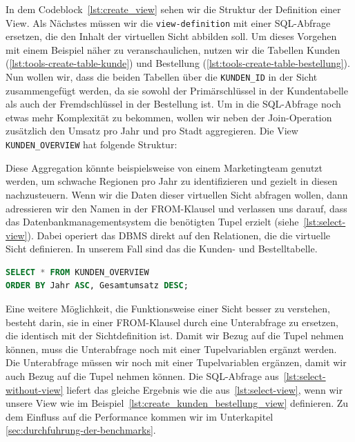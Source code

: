 In dem Codeblock~\ref{lst:create_view} sehen wir die Struktur der Definition einer View.
Als Nächstes müssen wir die \texttt{view-definition} mit einer SQL-Abfrage ersetzen, die den Inhalt der virtuellen Sicht abbilden soll.
Um dieses Vorgehen mit einem Beispiel näher zu veranschaulichen, nutzen wir die Tabellen Kunden (\ref{lst:tools-create-table-kunde}) und Bestellung (\ref{lst:tools-create-table-bestellung}).
Nun wollen wir, dass die beiden Tabellen über die \texttt{KUNDEN\_ID} in der Sicht zusammengefügt werden, da sie sowohl der Primärschlüssel in der Kundentabelle als auch der Fremdschlüssel in der Bestellung ist.
Um in die SQL-Abfrage noch etwas mehr Komplexität zu bekommen, wollen wir neben der Join-Operation zusätzlich den Umsatz pro Jahr und pro Stadt aggregieren.
Die View \texttt{KUNDEN\_OVERVIEW} hat folgende Struktur:

\vspace{-5pt}


Diese Aggregation könnte beispielsweise von einem Marketingteam genutzt werden, um schwache Regionen pro Jahr zu identifizieren und gezielt in diesen nachzusteuern.
Wenn wir die Daten dieser virtuellen Sicht abfragen wollen, dann adressieren wir den Namen in der FROM-Klausel und verlassen uns darauf, dass das Datenbankmanagementsystem die benötigten Tupel erzielt (siehe~\ref{lst:select-view}).
Dabei operiert das DBMS direkt auf den Relationen, die die virtuelle Sicht definieren.
In unserem Fall sind das die Kunden- und Bestelltabelle.

\vspace{-5pt}
\begin{lstlisting}[language=SQL,caption=SQL-Befehl mit verwendeter View,label={lst:select-view}]
SELECT * FROM KUNDEN_OVERVIEW
ORDER BY Jahr ASC, Gesamtumsatz DESC;
\end{lstlisting}
\vspace{-5pt}

Eine weitere Möglichkeit, die Funktionsweise einer Sicht besser zu verstehen, besteht darin, sie in einer FROM-Klausel durch eine Unterabfrage zu ersetzen, die identisch mit der Sichtdefinition ist.
Damit wir Bezug auf die Tupel nehmen können, muss die Unterabfrage noch mit einer Tupelvariablen ergänzt werden.
Die Unterabfrage müssen wir noch mit einer Tupelvariablen ergänzen, damit wir auch Bezug auf die Tupel nehmen können.
Die SQL-Abfrage aus~\ref{lst:select-without-view} liefert das gleiche Ergebnis wie die aus~\ref{lst:select-view}, wenn wir unsere View wie im Beispiel~\ref{lst:create_kunden_bestellung_view} definieren.
Zu dem Einfluss auf die Performance kommen wir im Unterkapitel \ref{sec:durchfuhrung-der-benchmarks}.

